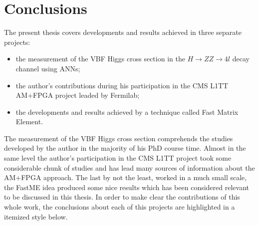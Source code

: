 \chapter{Conclusions}
The present thesis covers developments and results achieved in three separate projects:
\begin{itemize}
	\item the measurement of the VBF Higgs cross section in the $H \rightarrow ZZ \rightarrow 4l$ decay channel using ANNs;
	\item the author's contributions during his participation in the CMS L1TT AM+FPGA project leaded by Fermilab;
	\item the developments and results achieved by a technique called Fast Matrix Element.
\end{itemize}

The measurement of the VBF Higgs cross section comprehends the studies developed by the author in the majority of his PhD course time. Almost in the same level the author's participation in the CMS L1TT project took some considerable chunk of studies and has lead many sources of information about the AM+FPGA approach. The last by not the least, worked in a much small scale, the FastME idea produced some nice results which has been considered relevant to be discussed in this thesis. In order to make clear the contributions of this whole work, the conclusions about each of this projects are highlighted in a itemized style below.

